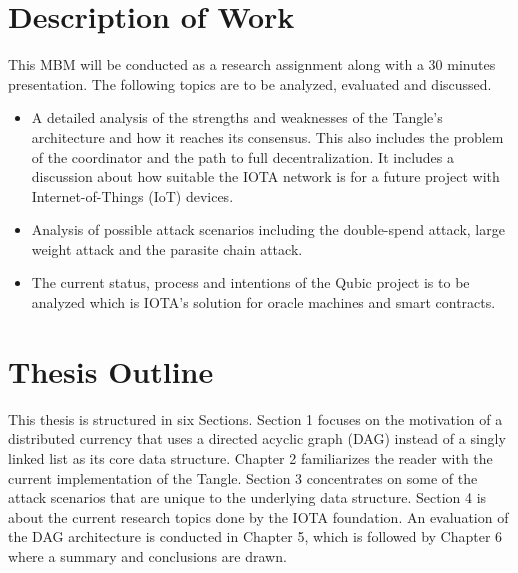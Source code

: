 \section{Description of Work}
This MBM will be conducted as a research assignment along with a 30 minutes presentation. The following topics are to be analyzed, evaluated and discussed.
\begin{itemize}
    \item A detailed analysis of the strengths and weaknesses of the Tangle's architecture and how it reaches its consensus. This also includes the problem of the coordinator and the path to full decentralization. It includes a discussion about how suitable the IOTA network is for a future project with Internet-of-Things (IoT) devices.
    \item Analysis of possible attack scenarios including the double-spend attack, large weight attack and the parasite chain attack.
    \item The current status, process and intentions of the Qubic project is to be analyzed which is IOTA's solution for oracle machines and smart contracts.
\end{itemize}

\section{Thesis Outline}

This thesis is structured in six Sections. Section 1 focuses on the motivation of a distributed currency that uses a directed acyclic graph (DAG) instead of a singly linked list as its core data structure. Chapter 2 familiarizes the reader with the current implementation of the Tangle. Section 3 concentrates on some of the attack scenarios that are unique to the underlying data structure. Section 4 is about the current research topics done by the IOTA foundation. An evaluation of the DAG architecture is conducted in Chapter 5, which is followed by Chapter 6 where a summary and conclusions are drawn.